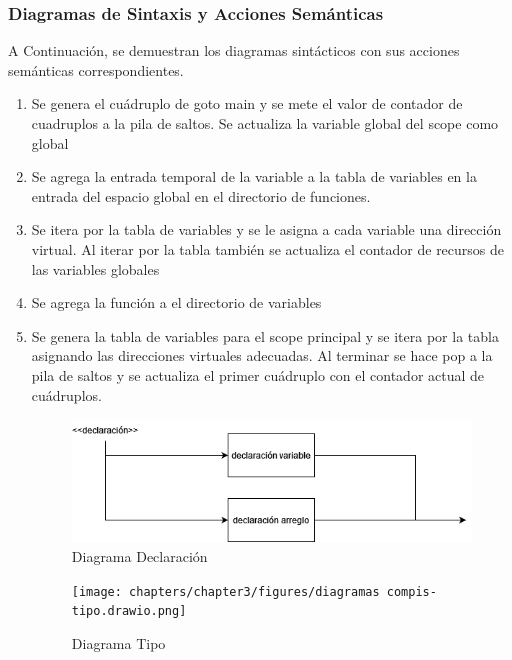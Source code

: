 \subsubsection{Diagramas de Sintaxis y Acciones Semánticas}
A Continuación, se demuestran los diagramas sintácticos con sus acciones semánticas correspondientes.

\begin{enumerate}
    \begin{figure}[!htbp]
            \centering
            \texttt{[image: chapters/chapter3/figures/diagramas compis-Programa.drawio(1).png]}
            \caption{Diagrama Programa}
            \label{fig:my_label}
    \end{figure}
    \FloatBarrier
    \item Se genera el cuádruplo de goto main y se mete el valor de contador de cuadruplos a la pila de saltos. Se actualiza la variable global del scope como global
    \item Se agrega la entrada temporal de la variable a la tabla de variables en la entrada del espacio global en el directorio de funciones.
    \item Se itera por la tabla de variables y se le asigna a cada variable una dirección virtual. Al iterar por la tabla también se actualiza el contador de recursos de las variables globales
    \item Se agrega la función a el directorio de variables
    \item Se genera la tabla de variables para el scope principal y se itera por la tabla asignando las direcciones virtuales adecuadas. Al terminar se hace pop a la pila de saltos y se actualiza el primer cuádruplo con el contador actual de cuádruplos.
    \newpage
    
    \begin{figure}[!htbp]
            \centering
            \includegraphics[width=\textwidth]{chapters/chapter3/figures/diagramas compis-declaración.drawio(1).png}
            \caption{Diagrama Declaración}
            \label{fig:my_label}
    \end{figure}
    \FloatBarrier
    \begin{figure}[!htbp]
            \centering
            \texttt{[image: chapters/chapter3/figures/diagramas compis-tipo.drawio.png]}
            \caption{Diagrama Tipo}
            \label{fig:my_label}
    \end{figure}
    \FloatBarrier
    

\end{enumerate}
